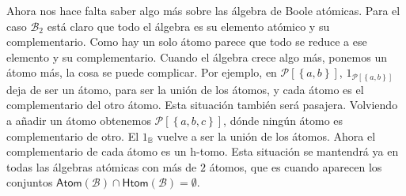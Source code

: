\documentclass[final,12pt,a4paper,twoside,fleqn]{extbook}
\newcommand{\set}[1]{\ensuremath{\left\lbrace{#1}\right\rbrace}}
\newcommand{\setB}{\ensuremath{\mathbb{B}}}
\newcommand{\algB}{\ensuremath{\mathscr{B}}}
\theoremstyle{definition}
\theoremstyle{remark}
\begin{document}
	Ahora nos hace falta saber algo más sobre las álgebra de Boole atómicas.
Para el caso \({\algB}_{2}\) está claro que todo el álgebra es su elemento
atómico y su complementario. Como hay un solo átomo parece que todo se reduce
a ese elemento y su complementario. Cuando el álgebra crece algo más, ponemos
un átomo más, la cosa se puede complicar. Por ejemplo, en
\( \mathscr{P} \left[ \set{a,b} \right] \), \( 1_{\mathscr{P} \left[
\set{a,b} \right]} \) deja de ser un átomo, para ser la unión de los átomos,
y cada átomo es el complementario del otro átomo. Esta situación también será
pasajera. Volviendo a añadir un átomo obtenemos \( \mathscr{P} \left[
\set{a,b,c} \right] \), dónde ningún átomo es complementario de otro. El \(
1_\setB \) vuelve a ser la unión de los átomos. Ahora el complementario de
cada átomo es un h-tomo. Esta situación se mantendrá ya en todas las álgebras
atómicas con más de \(2\) átomos, que es cuando aparecen los conjuntos \(
\mathsf{Atom} \left( \algB \right) \cap \mathsf{Htom} \left( \algB \right) =
\emptyset \). 





\printbibliography
\end{document}
